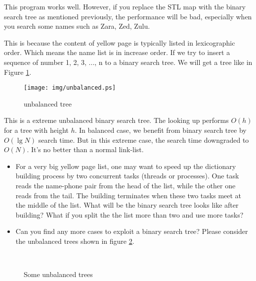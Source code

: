 \documentclass{article}
\begin{document}
This program works well. However, if you replace the STL map
with the binary search tree as mentioned previously, the
performance will be bad, especially when you search some names such
as Zara, Zed, Zulu.

This is because the content of yellow page is typically listed
in lexicographic order. Which means the name list is in increase
order. If we try to insert a sequence of number 1, 2, 3, ..., n
to a binary search tree. We will get a tree like in Figure \ref{fig:unbalanced-tree}.

\begin{figure}[htbp]
       \centering
	\texttt{[image: img/unbalanced.ps]}
        \caption{unbalanced tree} \label{fig:unbalanced-tree}
\end{figure}

This is a extreme unbalanced binary search tree. The looking up performs
$O(h)$ for a tree with height $h$. In balanced case, we benefit from
binary search tree by $O(\lg N)$ search time. But in this extreme case,
the search time downgraded to $O(N)$. It's no better than a normal link-list.

\begin{Exercise}

\begin{itemize}
\item For a very big yellow page list, one may want to speed up the
dictionary building process by two concurrent tasks (threads or processes).
One task reads the name-phone pair from the head of the list, while the
other one reads from the tail. The building terminates when these
two tasks meet at the middle of the list. What will be the binary
search tree looks like after building? What if you split the the
list more than two and use more tasks?

\item Can you find any more cases to exploit a binary search tree?
Please consider the unbalanced trees shown in figure
\ref{fig:unbalanced-trees}.
\end{itemize}

\end{Exercise}

\begin{figure}[htbp]
       \centering
        \\
       \caption{Some unbalanced trees}
       \label{fig:unbalanced-trees}
\end{figure}
\end{document}
